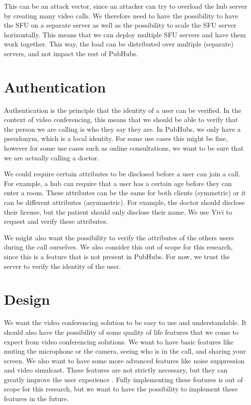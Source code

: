 \documentclass{report}
\begin{document}
This can be an attack vector, since an attacker can try to overload the hub server by creating many video calls. We
therefore need to have the possibility to have the SFU on a separate server as well as the possibility to scale the SFU
server horizontally. This means that we can deploy multiple SFU servers and have them work together.
This way, the load can be distributed over multiple (separate) servers, and not impact the rest of PubHubs.

\section{Authentication}
Authentication is the principle that the identity of a user can be verified. In the context of video conferencing,
this means that we should be able to verify that the person we are calling is who they say they are. In PubHubs, we
only have a pseudonym, which is a local identity. For some use cases this might be fine, however for some use cases
such as online consultations, we want to be sure that we are actually calling a doctor.

We could require certain attributes to be disclosed before a user can join a call. For example, a hub
can require that a user has a certain age before they can enter a room. These attributes can be the same for both
clients (symmetric) or it can be different attributes (asymmetric). For example, the doctor should disclose their license, but the patient should only
disclose their name. We use Yivi to request and verify these attributes. 

We might also want the possibility to verify the attributes of the others users during the call ourselves. We also
consider this out of scope for this research, since this is a feature that is not present in PubHubs. For now, we trust
the server to verify the identity of the user.

\section{Design}
We want the video conferencing solution to be easy to use and understandable. It should also have the possibility of
some quality of life features that we come to expect from video conferencing solutions. We want to have basic
features like muting the microphone or the camera, seeing who is in the call, and sharing your screen. We also want
to have some more advanced features like noise suppression and video simulcast. These features are not strictly
necessary, but they can greatly improve the user experience \cite{skowronek_quality_2022}.
Fully implementing these features is out of scope for this research, but we want to have the possibility to implement
these features in the future.
\end{document}
